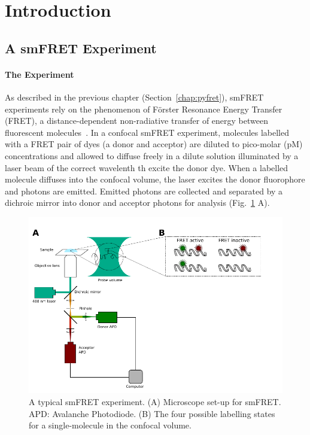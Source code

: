 \section{Introduction}
\subsection{A smFRET Experiment}
\paragraph{The Experiment}
As described in the previous chapter (Section~\ref{chap:pyfret}), smFRET experiments rely on the phenomenon of F\"{o}rster Resonance Energy Transfer (FRET), a distance-dependent non-radiative transfer of energy between fluorescent molecules~\cite{forster48, ha96}. In a confocal smFRET experiment, molecules labelled with a FRET pair of dyes (a donor and acceptor) are diluted to pico-molar (pM) concentrations and allowed to diffuse freely in a dilute solution illuminated by a laser beam of the correct wavelenth th excite the donor dye. When a labelled molecule diffuses into the confocal volume, the laser excites the donor fluorophore and photons are emitted.  Emitted photons are collected and separated by a dichroic mirror into donor and acceptor photons for analysis (Fig.~\ref{fig:schematic} A).
 

\begin{figure}[b]
   \begin{center}
      \includegraphics*[width=5in]{inference/S1_diagram_scheme.pdf}
      \caption{A typical smFRET experiment. (A) Microscope set-up for smFRET. APD: Avalanche Photodiode. (B) The four possible labelling states for a single-molecule in the confocal volume.}
      \label{fig:schematic}
   \end{center}
\end{figure}


